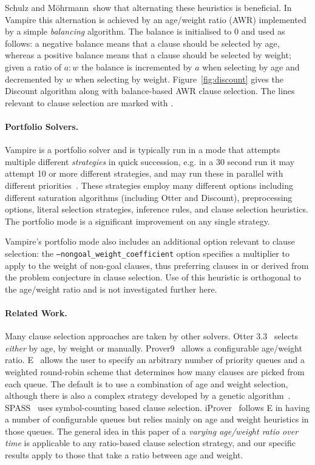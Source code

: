 \documentclass{llncs}
\newcommand{\sandm}{Schulz and M{\"{o}}hrmann}
\begin{document}
\sandm~show that alternating these heuristics is beneficial. In Vampire this alternation is achieved by an age/weight ratio (AWR) implemented by a simple \emph{balancing} algorithm. The balance is initialised to 0 and used as follows: a negative balance means that a clause should be selected by age, whereas a positive balance means that a clause should be selected by weight; given a ratio of $a:w$ the balance is incremented by $a$ when selecting by age and decremented by $w$ when selecting by weight.
Figure~\ref{fig:discount} gives the Discount algorithm along with balance-based AWR clause selection. The lines relevant to clause selection are marked with \Mark.

\paragraph{Portfolio Solvers.}

Vampire is a portfolio solver and is typically run in a mode that attempts multiple different \emph{strategies} in quick succession, e.g. in a 30 second run it may attempt 10 or more different strategies, and may run these in parallel with different priorities~\cite{dynamic-strategy-priority}. These strategies employ many different options including different saturation algorithms (including Otter and Discount), preprocessing options, literal selection strategies, inference rules, and clause selection heuristics. The portfolio mode is a significant improvement on any single strategy. 

Vampire's portfolio mode also includes an additional option relevant to clause selection: the \texttt{--nongoal\_weight\_coefficient} option specifies a multiplier to apply to the weight of non-goal clauses, thus preferring clauses in or derived from the problem conjecture in clause selection.
Use of this heuristic is orthogonal to the age/weight ratio and is not investigated further here.

\paragraph{Related Work.}
Many clause selection approaches are taken by other solvers.
Otter 3.3~\cite{otter3} selects \emph{either} by age, by weight or manually.
Prover9~\cite{prover9} allows a configurable age/weight ratio.
E~\cite{E} allows the user to specify an arbitrary number of priority queues and a weighted round-robin scheme that determines how many clauses are picked from each queue.
The default is to use a combination of age and weight selection, although there is also a complex strategy developed by a genetic algorithm~\cite{genetic-heuristics}. 
SPASS~\cite{Spass} uses symbol-counting based clause selection. 
iProver~\cite{Iprover} follows E in having a number of configurable queues but relies mainly on age and weight heuristics in those queues. 
The general idea in this paper of a \emph{varying age/weight ratio over time} is applicable to any ratio-based clause selection strategy, and our specific results apply to those that take a ratio between age and weight.
\end{document}
